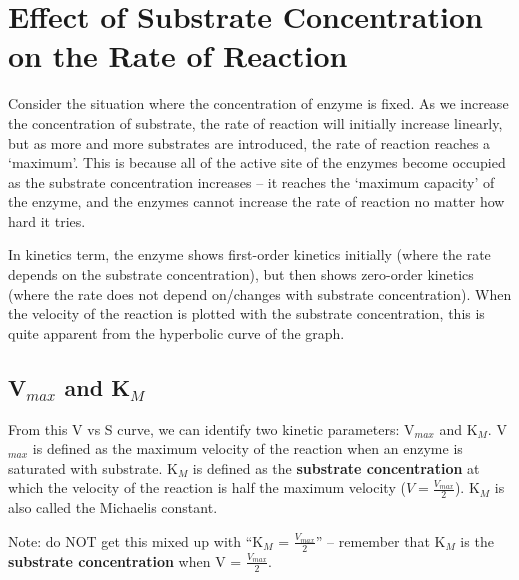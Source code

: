 \section{Effect of Substrate Concentration on the Rate of Reaction}

\begin{center}
\end{center}

Consider the situation where the concentration of enzyme is fixed.
As we increase the concentration of substrate, the rate of reaction will initially increase linearly, but as more and more substrates are introduced, the rate of reaction reaches a `maximum'.
This is because all of the active site of the enzymes become occupied as the substrate concentration increases -- it reaches the `maximum capacity' of the enzyme, and the enzymes cannot increase the rate of reaction no matter how hard it tries.

\begin{center}
\end{center}

In kinetics term, the enzyme shows first-order kinetics initially (where the rate depends on the substrate concentration), but then shows zero-order kinetics (where the rate does not depend on/changes with substrate concentration).
When the velocity of the reaction is plotted with the substrate concentration, this is quite apparent from the hyperbolic curve of the graph.

\subsection{V$_{max}$ and K$_M$}

From this V vs S curve, we can identify two kinetic parameters: V$_{max}$ and K$_M$.
V$_{max}$ is defined as the maximum velocity of the reaction when an enzyme is saturated with substrate.
K$_M$ is defined as the \textbf{substrate concentration} at which the velocity of the reaction is half the maximum velocity ($V = \frac{V_{max}}{2}$).
K$_M$ is also called the Michaelis constant.

Note: do NOT get this mixed up with ``K$_M$ = $\frac{V_{max}}{2}$'' -- remember that K$_M$ is the \textbf{substrate concentration} when V = $\frac{V_{max}}{2}$.









